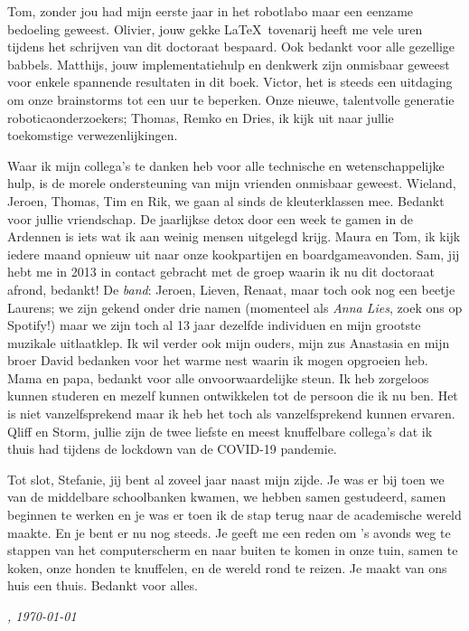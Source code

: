 \documentclass[\home/main.tex]{subfiles}
\begin{document}
Tom, zonder jou had mijn eerste jaar in het robotlabo maar een eenzame bedoeling geweest. Olivier, jouw gekke \LaTeX\ tovenarij heeft me vele uren tijdens het schrijven van dit doctoraat bespaard. Ook bedankt voor alle gezellige babbels.
Matthijs, jouw implementatiehulp en denkwerk zijn onmisbaar geweest voor enkele spannende resultaten in dit boek.
Victor, het is steeds een uitdaging om onze brainstorms tot een uur te beperken.
Onze nieuwe, talentvolle generatie roboticaonderzoekers; Thomas, Remko en Dries, ik kijk uit naar jullie toekomstige verwezenlijkingen.

Waar ik mijn collega's te danken heb voor alle technische en wetenschappelijke hulp, is de morele ondersteuning van mijn vrienden onmisbaar geweest.
Wieland, Jeroen, Thomas, Tim en Rik, we gaan al sinds de kleuterklassen mee. Bedankt voor jullie vriendschap. De jaarlijkse detox door een week te gamen in de Ardennen is iets wat ik aan weinig mensen uitgelegd krijg.
Maura en Tom, ik kijk iedere maand opnieuw uit naar onze kookpartijen en boardgameavonden.
Sam, jij hebt me in 2013 in contact gebracht met de groep waarin ik nu dit doctoraat afrond, bedankt!
De \textit{band}: Jeroen, Lieven, Renaat, maar toch ook nog een beetje Laurens; we zijn gekend onder drie namen (momenteel als \textit{Anna Lies}, zoek ons op Spotify!) maar we zijn toch al 13 jaar dezelfde individuen en mijn grootste muzikale uitlaatklep.
Ik wil verder ook mijn ouders, mijn zus Anastasia en mijn broer David bedanken voor het warme nest waarin ik mogen opgroeien heb. 
Mama en papa, bedankt voor alle onvoorwaardelijke steun. Ik heb zorgeloos kunnen studeren en mezelf kunnen ontwikkelen tot de persoon die ik nu ben. Het is niet vanzelfsprekend maar ik heb het toch als vanzelfsprekend kunnen ervaren.
Qliff en Storm, jullie zijn de twee liefste en meest knuffelbare collega's dat ik thuis had tijdens de lockdown van de COVID-19 pandemie.

Tot slot, Stefanie, jij bent al zoveel jaar naast mijn zijde. Je was er bij toen we van de middelbare schoolbanken kwamen, we hebben samen gestudeerd, samen beginnen te werken en je was er toen ik de stap terug naar de academische wereld maakte. En je bent er nu nog steeds. 
Je geeft me een reden om 's avonds weg te stappen van het computerscherm en naar buiten te komen in onze tuin, samen te koken, onze honden te knuffelen, en de wereld rond te reizen. Je maakt van ons huis een thuis. Bedankt voor alles. 

\vspace{1cm}

\begin{flushright}
    \textit{\theauthor, \today}
\end{flushright}
\end{document}
